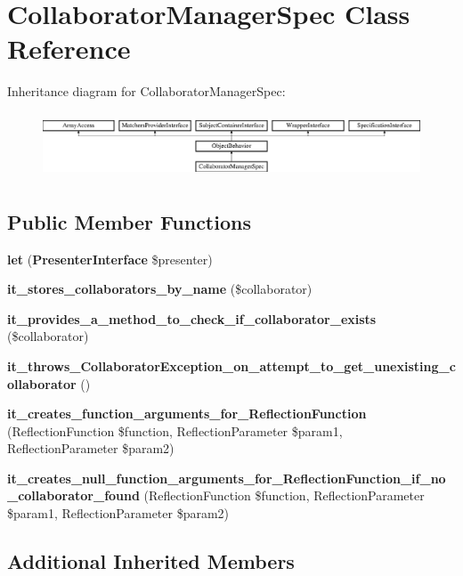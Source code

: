\section{Collaborator\+Manager\+Spec Class Reference}
\label{classspec_1_1_php_spec_1_1_runner_1_1_collaborator_manager_spec}
Inheritance diagram for Collaborator\+Manager\+Spec\+:\begin{figure}[H]
\begin{center}
\leavevmode
\includegraphics[height=1.953488cm]{classspec_1_1_php_spec_1_1_runner_1_1_collaborator_manager_spec}
\end{center}
\end{figure}
\subsection*{Public Member Functions}
\begin{DoxyCompactItemize}
\item 
{\bf let} ({\bf Presenter\+Interface} \$presenter)
\item 
{\bf it\+\_\+stores\+\_\+collaborators\+\_\+by\+\_\+name} (\$collaborator)
\item 
{\bf it\+\_\+provides\+\_\+a\+\_\+method\+\_\+to\+\_\+check\+\_\+if\+\_\+collaborator\+\_\+exists} (\$collaborator)
\item 
{\bf it\+\_\+throws\+\_\+\+Collaborator\+Exception\+\_\+on\+\_\+attempt\+\_\+to\+\_\+get\+\_\+unexisting\+\_\+collaborator} ()
\item 
{\bf it\+\_\+creates\+\_\+function\+\_\+arguments\+\_\+for\+\_\+\+Reflection\+Function} (Reflection\+Function \$function, Reflection\+Parameter \$param1, Reflection\+Parameter \$param2)
\item 
{\bf it\+\_\+creates\+\_\+null\+\_\+function\+\_\+arguments\+\_\+for\+\_\+\+Reflection\+Function\+\_\+if\+\_\+no\+\_\+collaborator\+\_\+found} (Reflection\+Function \$function, Reflection\+Parameter \$param1, Reflection\+Parameter \$param2)
\end{DoxyCompactItemize}
\subsection*{Additional Inherited Members}


